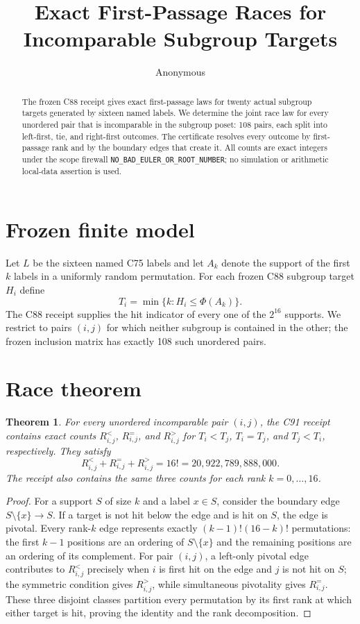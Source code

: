 \documentclass[10pt]{article}
\title{Exact First-Passage Races for Incomparable Subgroup Targets}
\author{Anonymous}
\date{}
\newtheorem{theorem}{Theorem}
\begin{document}
\maketitle
\begin{abstract}
The frozen C88 receipt gives exact first-passage laws for twenty actual
subgroup targets generated by sixteen named labels.  We determine the joint
race law for every unordered pair that is incomparable in the subgroup
poset: 108 pairs, each split into left-first, tie, and right-first outcomes.
The certificate resolves every outcome by first-passage rank and by the
boundary edges that create it.  All counts are exact integers under the scope
firewall \texttt{NO\_BAD\_EULER\_OR\_ROOT\_NUMBER}; no simulation or arithmetic
local-data assertion is used.
\end{abstract}

\section{Frozen finite model}
Let $L$ be the sixteen named C75 labels and let $A_k$ denote the support of
the first $k$ labels in a uniformly random permutation.  For each frozen C88
subgroup target $H_i$ define
\[
 T_i=\min\{k:H_i\leq\Phi(A_k)\}.
\]
The C88 receipt supplies the hit indicator of every one of the $2^{16}$
supports.  We restrict to pairs $(i,j)$ for which neither subgroup is
contained in the other; the frozen inclusion matrix has exactly 108 such
unordered pairs.

\section{Race theorem}
\begin{theorem}
For every unordered incomparable pair $(i,j)$, the C91 receipt contains exact
counts $R_{i,j}^{<}$, $R_{i,j}^{=}$, and $R_{i,j}^{>}$ for
$T_i<T_j$, $T_i=T_j$, and $T_j<T_i$, respectively.  They satisfy
\[
 R_{i,j}^{<}+R_{i,j}^{=}+R_{i,j}^{>}=16!
 =20{,}922{,}789{,}888{,}000.
\]
The receipt also contains the same three counts for each rank $k=0,\ldots,16$.
\end{theorem}
\begin{proof}
For a support $S$ of size $k$ and a label $x\in S$, consider the boundary
edge $S\setminus\{x\}\to S$.  If a target is not hit below the edge and is
hit on $S$, the edge is pivotal.  Every rank-$k$ edge represents exactly
$(k-1)!(16-k)!$ permutations: the first $k-1$ positions are an ordering of
$S\setminus\{x\}$ and the remaining positions are an ordering of its
complement.  For pair $(i,j)$, a left-only pivotal edge contributes to
$R_{i,j}^{<}$ precisely when $i$ is first hit on the edge and $j$ is not hit
on $S$; the symmetric condition gives $R_{i,j}^{>}$, while simultaneous
pivotality gives $R_{i,j}^{=}$.  These three disjoint classes partition every
permutation by its first rank at which either target is hit, proving the
identity and the rank decomposition.
\end{proof}
\end{document}
